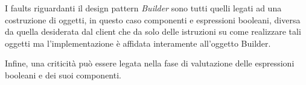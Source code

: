 I faults riguardanti il design pattern \emph{Builder} sono tutti quelli legati ad una costruzione di oggetti, in questo caso componenti e espressioni booleani, diversa da quella desiderata dal client che da solo delle istruzioni su come realizzare tali oggetti ma l'implementazione è affidata interamente all'oggetto Builder.

Infine, una criticità può essere legata nella fase di valutazione delle espressioni booleani e dei suoi componenti.